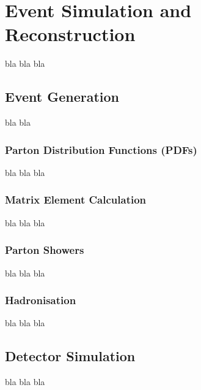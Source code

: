 \chapter{Event Simulation and Reconstruction}

	bla bla bla 

	\section{Event Generation}

			bla bla

		\subsection{Parton Distribution Functions (PDFs)}

			bla bla bla 

		\subsection{Matrix Element Calculation}

			bla bla bla 


		\subsection{Parton Showers}

			bla bla bla 


		\subsection{Hadronisation}

			bla bla bla 



	\section{Detector Simulation}
		bla bla bla 









